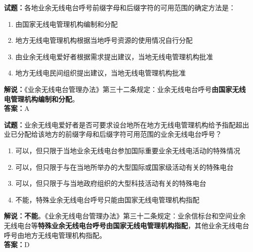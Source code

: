 \documentclass{ctexbook}
\begin{document}
\vspace{\baselineskip}

\noindent\textbf{试题：}各地业余无线电台呼号前缀字母和后缀字符的可用范围的确定方法是：
\begin{enumerate}[leftmargin=3em]
  \item 由国家无线电管理机构编制和分配
  \item 地方无线电管理机构根据当地呼号资源的使用情况自行分配
  \item 由业余无线电爱好者根据需求提出建议，当地无线电管理机构批准
  \item 地方无线电民间组织提出建议，当地无线电管理机构批准
\end{enumerate}
\noindent\textbf{解说：}《业余无线电台管理办法》第三十二条规定：业余无线电台呼号\textbf{由国家无线电管理机构编制和分配}。\\\noindent\textbf{答案：}A

\vspace{\baselineskip}

\noindent\textbf{试题：}业余无线电爱好者是否可要求设台地所在地方无线电管理机构给予指配超出业已分配给该地方的前缀字母和后缀字符可用范围的业余无线电台呼号？
\begin{enumerate}[leftmargin=3em]
  \item 可以，但只限于当地业余无线电台参加国际重要业余无线电活动的特殊情况
  \item 可以，但只限于与在当地所举办的大型国际或国家级活动有关的特殊电台
  \item 可以，但只限于与当地政府组织的大型科技活动有关的特殊电台
  \item 不能，特殊业余无线电台呼号只能由国家无线电管理机构指配
\end{enumerate}
\textbf{解说：不能}。《业余无线电台管理办法》第三十二条规定：业余信标台和空间业余无线电台等\textbf{特殊业余无线电台呼号由国家无线电管理机构指配}，其他业余无线电台呼号由地方无线电管理机构指配。\\\noindent\textbf{答案：}D

\vspace{\baselineskip}
\end{document}
